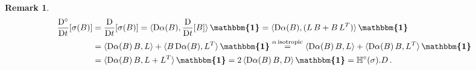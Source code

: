 \documentclass[10pt]{article}
\newcounter{theoremCounter}
\numberwithin{theoremCounter}{section}
\theoremstyle{plain}
\theoremstyle{definition}
\newtheorem{rem}[theoremCounter]{Remark}
\newcommand{\id}{{\boldsymbol{\mathbbm{1}}}}
\newcommand{\DD}{\mathrm{D}}
\def\H{\mathbb{H}}
\numberwithin{equation}{section}
\begin{document}
\begin{appendix}
\begin{rem}
	\begin{equation}
	\begin{alignedat}{2}
	\frac{\DD^{\circ}}{\DD t}[\sigma(B)] &= \frac{\DD}{\DD t}[\sigma(B)] = \langle \DD \alpha(B), \frac{\DD}{\DD t}[B] \rangle \, \id = \langle \DD \alpha(B) , (L \, B + B \, L^T) \rangle \, \id \\
	&= \langle \DD \alpha(B) \, B, L \rangle + \langle B \, \DD \alpha(B), L^T \rangle \, \id \overset{\alpha \, \textnormal{isotropic}}{=} \langle \DD \alpha(B) \, B, L \rangle + \langle \DD \alpha(B) \, B, L^T \rangle \, \id \\
	&= \langle \DD \alpha(B) \, B, L + L^T \rangle \, \id = 2 \, \langle \DD \alpha(B) \, B, D \rangle \, \id = \H^{\circ}(\sigma).D \, .
	\end{alignedat}
	\end{equation}
\end{rem}
%
%
%
%
%

\end{appendix}
\end{document}
